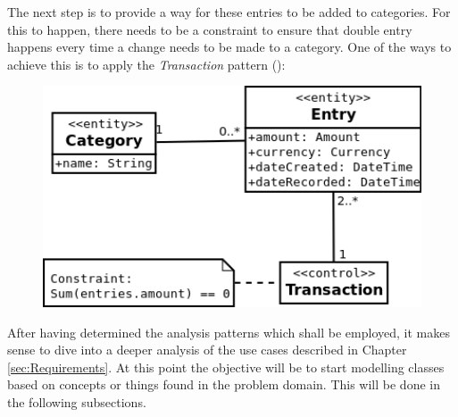 The next step is to provide a way for these entries to be added to categories.
For this to happen, there needs to be a constraint to ensure that double entry
happens every time a change needs to be made to a category. One of the ways to
achieve this is to apply the \emph{Transaction} pattern
(\cite[][Section~6.2]{fowler1997analysis}):
\begin{figure}[ht!]
  \begin{center}
    \includegraphics[width=14cm]{./contents/img/Class_Diagram_-_Transaction.png}
  \end{center}
\end{figure}
\FloatBarrier

After having determined the analysis patterns which shall be employed, it makes
sense to dive into a deeper analysis of the use cases described in Chapter
\ref{sec:Requirements}. At this point the objective will be to start modelling
classes based on concepts or things found in the problem domain. This will be
done in the following subsections.
